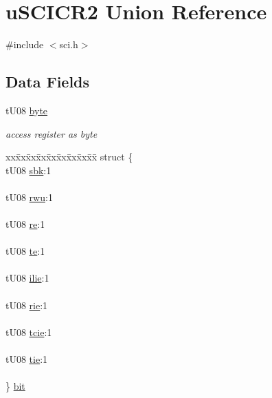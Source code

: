 \hypertarget{unionu_s_c_i_c_r2}{}\section{u\+S\+C\+I\+C\+R2 Union Reference}
\label{unionu_s_c_i_c_r2}


{\ttfamily \#include $<$sci.\+h$>$}

\subsection*{Data Fields}
\begin{DoxyCompactItemize}
\item 
\hypertarget{unionu_s_c_i_c_r2_aba308d63db050aed25cfd36c37e41ad4}{}t\+U08 \hyperlink{unionu_s_c_i_c_r2_aba308d63db050aed25cfd36c37e41ad4}{byte}\label{unionu_s_c_i_c_r2_aba308d63db050aed25cfd36c37e41ad4}

\begin{DoxyCompactList}\small\item\em access register as byte \end{DoxyCompactList}\item 
\hypertarget{unionu_s_c_i_c_r2_a5627073224d13fa2bd0c905fb92650d4}{}\begin{tabbing}
xx\=xx\=xx\=xx\=xx\=xx\=xx\=xx\=xx\=\kill
struct \{\\
\>tU08 \hyperlink{unionu_s_c_i_c_r2_a9b3aa2bfed067a01a4b74cc83cdab6de}{sbk}:1\\
\>\\
\>tU08 \hyperlink{unionu_s_c_i_c_r2_adb22899564622129224ae63da9a3a67a}{rwu}:1\\
\>\\
\>tU08 \hyperlink{unionu_s_c_i_c_r2_ac6d74d3ebe4b113712d9ddc1eaaf95a5}{re}:1\\
\>\\
\>tU08 \hyperlink{unionu_s_c_i_c_r2_aca875818430e47d7d35a79985f56c37e}{te}:1\\
\>\\
\>tU08 \hyperlink{unionu_s_c_i_c_r2_acd5448493fb44eb46e4edcfc96b9c122}{ilie}:1\\
\>\\
\>tU08 \hyperlink{unionu_s_c_i_c_r2_aa6ce8b0df94e95309622dc62e2d7e8c9}{rie}:1\\
\>\\
\>tU08 \hyperlink{unionu_s_c_i_c_r2_aa2b6cc3c8ca86269b018e585c7d7b61f}{tcie}:1\\
\>\\
\>tU08 \hyperlink{unionu_s_c_i_c_r2_a0c1c0a022ca4060b45ec6ea28718e24a}{tie}:1\\
\>\\
\} \hyperlink{unionu_s_c_i_c_r2_a5627073224d13fa2bd0c905fb92650d4}{bit}\label{unionu_s_c_i_c_r2_a5627073224d13fa2bd0c905fb92650d4}
\\


\end{tabbing}
\end{DoxyCompactItemize}
